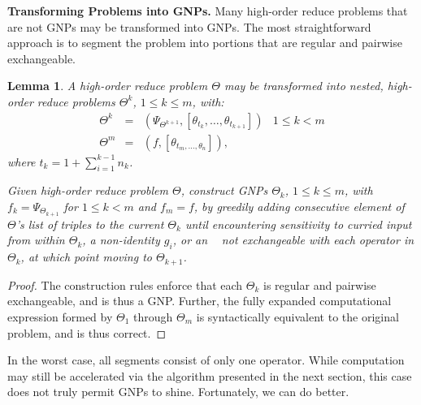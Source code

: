 \documentclass{article}
\newtheorem{lemma}{Lemma}
\newcommand{\opsym}{{\scriptstyle \mathrm{o\!p}}}
\newcommand{\opcurry}[3][]{\mathop{\opsym^{#1}_{#2}{#3}}}
\newcommand{\op}[2][]{\opcurry[#1]{#2}{}}
\begin{document}

{\bf Transforming Problems into GNPs.}  Many high-order reduce
problems that are not GNPs may be transformed into GNPs.  The most
straightforward approach is to segment the problem into portions that
are regular and pairwise exchangeable.
\begin{lemma}
  A high-order reduce problem $\Theta$ may be transformed into nested,
  high-order reduce problems $\Theta^k$, $1 \leq k \leq m$, with:
  \[ \begin{array}{rclr}
    \Theta^k & = & (\Psi_{\Theta^{k+1}},[\theta_{t_k},\ldots,\theta_{t_{k+1}}]) & 1 \leq k < m \\
    \Theta^m & = & (f,[\theta_{t_m,\ldots,\theta_n}]),
  \end{array} \]
  where $t_k = 1 + \sum_{i=1}^{k-1} n_k$.

  Given high-order reduce problem $\Theta$, construct GNPs $\Theta_k$,
  $1 \leq k \leq m$, with $f_k = \Psi_{\Theta_{k+1}}$ for $1 \leq k <
  m$ and $f_m = f$, by greedily adding consecutive element of
  $\Theta$'s list of triples to the current $\Theta_k$ until
  encountering sensitivity to curried input from within $\Theta_k$, a
  non-identity $g_i$, or an $\op{i}$ not exchangeable with each
  operator in $\Theta_k$, at which point moving to $\Theta_{k+1}$.
\end{lemma}
\begin{proof}
  The construction rules enforce that each $\Theta_k$ is regular and
  pairwise exchangeable, and is thus a GNP.  Further, the fully
  expanded computational expression formed by $\Theta_1$ through
  $\Theta_m$ is syntactically equivalent to the original problem, and
  is thus correct.
\end{proof}
In the worst case, all segments consist of only one operator.  While
computation may still be accelerated via the algorithm presented in
the next section, this case does not truly permit GNPs to shine.
Fortunately, we can do better.
\end{document}
